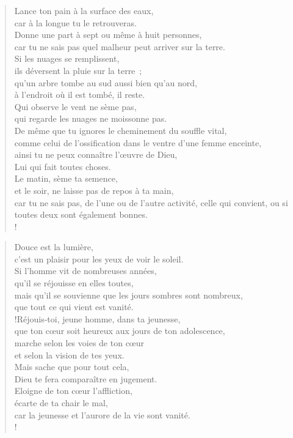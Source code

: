 \documentclass[french,twoside]{book} %
\def\mednobreak{\ifdim\lastskip<\medskipamount
  \removelastskip\nopagebreak\medskip\fi}
\newcommand{\labelblock}[1]{\medbreak{\noindent\color{rubric}\bfseries #1}\par\mednobreak}
\begin{document}
\begin{verse}
Lance ton pain à la surface des eaux, \\
car à la longue tu le retrouveras.\\
Donne une part à sept ou même à huit personnes, \\
car tu ne sais pas quel malheur peut arriver sur la terre.\\
Si les nuages se remplissent, \\
ils déversent la pluie sur la terre ; \\
qu’un arbre tombe au sud aussi bien qu’au nord, \\
à l’endroit où il est tombé, il reste.\\
Qui observe le vent ne sème pas, \\
qui regarde les nuages ne moissonne pas.\\
De même que tu ignores le cheminement du souffle vital, \\
comme celui de l’ossification dans le ventre d’une femme enceinte, \\
ainsi tu ne peux connaître l’œuvre de Dieu, \\
Lui qui fait toutes choses.\\
Le matin, sème ta semence, \\
et le soir, ne laisse pas de repos à ta main, \\
car tu ne sais pas, de l’une ou de l’autre activité, celle qui convient, ou si toutes deux sont également bonnes.\\!
\end{verse}

\labelblock{Jouir de la vie avec retenue}


\begin{verse}
Douce est la lumière, \\
c’est un plaisir pour les yeux de voir le soleil.\\
Si l’homme vit de nombreuses années, \\
qu’il se réjouisse en elles toutes, \\
mais qu’il se souvienne que les jours sombres sont nombreux, \\
que tout ce qui vient est vanité.\\!Réjouis-toi, jeune homme, dans ta jeunesse, \\
que ton cœur soit heureux aux jours de ton adolescence, \\
marche selon les voies de ton cœur \\
et selon la vision de tes yeux. \\
Mais sache que pour tout cela, \\
Dieu te fera comparaître en jugement.\\
Eloigne de ton cœur l’affliction, \\
écarte de ta chair le mal, \\
car la jeunesse et l’aurore de la vie sont vanité.\\!
\end{verse}
\end{document}
